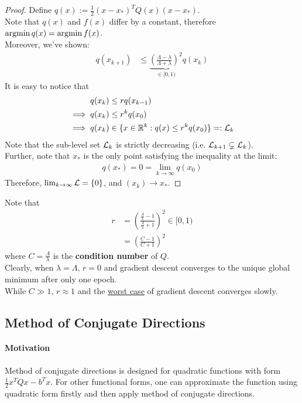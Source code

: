 \documentclass{article}
\begin{document}
	\begin{proof}
		Define $q(x) := \frac{1}{2} (x - x_*)^T Q (x) (x - x_*)$. \\
		Note that $q(x)$ and $f(x)$ differ by a constant, therefore $\operatorname*{argmin} q(x) = \operatorname*{argmin} f(x)$. \\
		Moreover, we've shown:
		\begin{align}
			q(x_{k+1}) &\leq \underbrace{\left(\frac{\Lambda - \lambda}{\Lambda + \lambda} \right)^2}_{\in [0, 1)} q(x_k)
		\end{align}
		It is easy to notice that
		\begin{align}
			q(x_k) &\leq r q(x_{k-1}) \\
			\implies q(x_k) &\leq r^k q(x_0) \\
			\implies q(x_k) &\in \{x \in \mathbb{R}^k: q(x) \leq r^k q(x_0)\} =: \mathcal{{L}}_k
		\end{align}
		Note that the sub-level set $\mathcal{{L}}_k$ is strictly decreasing (i.e. $\mathcal{{L}}_{k+1} \subsetneq \mathcal{{L}}_k$). \\
		Further, note that $x_*$ is the only point satisfying the inequality at the limit:
		\begin{align}
			q(x_*) = 0 = \lim_{k \to \infty} q(x_0)
		\end{align}
		Therefore, $\lim_{k \to \infty}\mathcal{{L}} = \{0\}$, and $(x_k) \to x_*$.
	\end{proof}
	
	\begin{remark}
		Note that 
		\begin{align}
			r &= \left(
			\frac{\frac{\Lambda}{\lambda} - 1}{\frac{\Lambda}{\lambda} + 1}
			\right)^2 \in [0, 1) \\
			&= \left(\frac{C - 1}{C + 1}\right)^2
		\end{align}
		where $C = \frac{\Lambda}{\lambda}$ is the \textbf{condition number} of $Q$. \\
		Clearly, when $\lambda = \Lambda$, $r = 0$ and gradient descent converges to the unique global minimum after only one epoch. \\
		While $C \gg 1$, $r \approx 1$ and the \ul{worst case} of gradient descent converges slowly.
	\end{remark}
	
	\subsection{Method of Conjugate Directions}
	\paragraph{Motivation} Method of conjugate directions is designed for quadratic functions with form $\frac{1}{2} x^T Q x - b^T x$. For other functional forms, one can approximate the function using quadratic form firstly and then apply method of conjugate directions.
	
\end{document}
